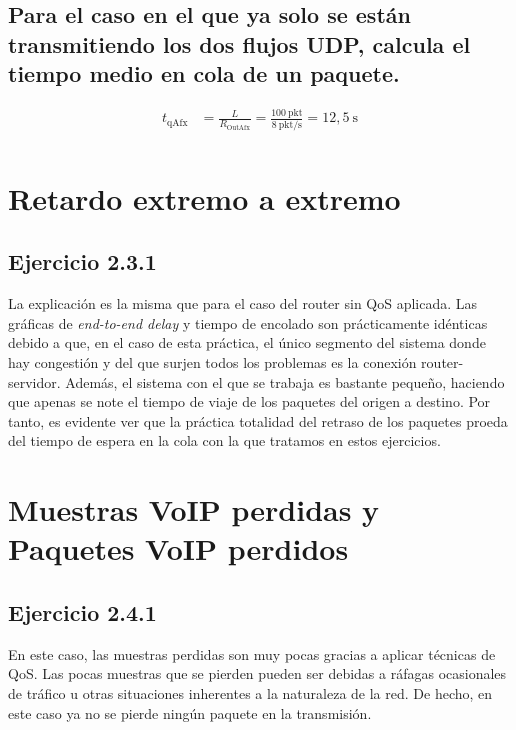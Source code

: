 \vspace{0,3cm}

\subsection{Para el caso en el que ya solo se están transmitiendo los dos flujos UDP, calcula el tiempo medio en cola de
un paquete.}
\[
    \begin{aligned}
        t_{\text{qAfx}} &= \frac{L}{R_{\text{OutAfx}}} = \frac{100~\text{pkt}}{8~\text{pkt/s}}= 12,5~\text{s} \\
    \end{aligned}
\]

\vspace{1cm}

\section{Retardo extremo a extremo}

\subsection{Ejercicio 2.3.1}
La explicación es la misma que para el caso del router sin QoS aplicada. Las gráficas de \textit{end-to-end delay}
y tiempo de encolado son prácticamente idénticas debido a que, en el caso de esta práctica, el único segmento del 
sistema donde hay congestión y del que surjen todos los problemas es la conexión router-servidor. Además, el sistema
con el que se trabaja es bastante pequeño, haciendo que apenas se note el tiempo de viaje de los paquetes del origen 
a destino. Por tanto, es evidente ver que la práctica totalidad del retraso de los paquetes proeda del tiempo de 
espera en la cola con la que tratamos en estos ejercicios.

\vspace{1cm}

\section{Muestras VoIP perdidas y Paquetes VoIP perdidos}

\subsection{Ejercicio 2.4.1}

En este caso, las muestras perdidas son muy pocas gracias a aplicar técnicas de QoS. Las pocas muestras
que se pierden pueden ser debidas a ráfagas ocasionales de tráfico u otras situaciones inherentes a la naturaleza de la red.
De hecho, en este caso ya no se pierde ningún paquete en la transmisión.

